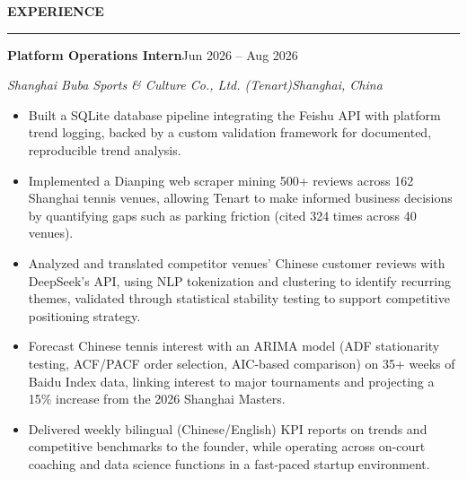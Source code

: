 \documentclass[letterpaper,10pt]{article}
\newcommand{\resumeSection}[1]{%
  \vspace{3pt}%
  {\large\bfseries #1}\par
  \vspace{-4pt}\rule{\linewidth}{0.4pt}\par
  \vspace{1pt}%
}
\newcommand{\entry}[4]{%
  \textbf{#1}\hfill #2\par
  \textit{#3}\hfill \textit{#4}\par
}
\newenvironment{bullets}{\begin{itemize}}{\end{itemize}\vspace{1pt}}
\begin{document}
\resumeSection{EXPERIENCE}
\entry{Platform Operations Intern}{Jun 2026 -- Aug 2026}
      {Shanghai Buba Sports \& Culture Co., Ltd. (Tenart)}{Shanghai, China}
\begin{bullets}
  \item Built a SQLite database pipeline integrating the Feishu API with platform trend logging, backed by a custom validation framework for documented, reproducible trend analysis.
  \item Implemented a Dianping web scraper mining 500+ reviews across 162 Shanghai tennis venues, allowing Tenart to make informed business decisions by quantifying gaps such as parking friction (cited 324 times across 40 venues).
  \item Analyzed and translated competitor venues' Chinese customer reviews with DeepSeek's API, using NLP tokenization and clustering to identify recurring themes, validated through statistical stability testing to support competitive positioning strategy.
  \item Forecast Chinese tennis interest with an ARIMA model (ADF stationarity testing, ACF/PACF order selection, AIC-based comparison) on 35+ weeks of Baidu Index data, linking interest to major tournaments and projecting a 15\% increase from the 2026 Shanghai Masters.
  \item Delivered weekly bilingual (Chinese/English) KPI reports on trends and competitive benchmarks to the founder, while operating across on-court coaching and data science functions in a fast-paced startup environment.
\end{bullets}
\end{document}
